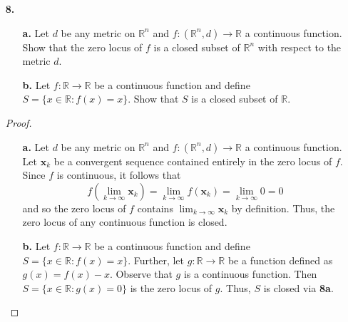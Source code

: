 \documentclass[ 12pt ]{article}
\begin{document}
\begin{enumerate}
		\begin{proof}
			Suppose by contradiction that there exists a closed set analog for the local continuity condition in terms of open sets. Let $\textbf{f} : \mathbb{R}^n \to \mathbb{R}^m$ be
			a constant function, $\textbf{f}(\textbf{x}) = \textbf{a} \in \mathbb{R}^m$ for all $\textbf{x} \in \mathbb{R}^n$. Clearly we can see that $\textbf{f}$ is a continuous
			function (see \textbf{2b}, same argument for $\mathbb{R}^2$ can be applied here). Let $B = \{ \textbf{a} \}$. Observe that $B$ is a closed set since $\lim_{k \to \infty}
			\textbf{a} = \textbf{a} \in B$. Additionally, the only proper subset of $B$ is $\varnothing$. Then by assumption, there exists a closed set $A \subseteq \mathbb{R}^n$ such
			that $\textbf{f}(A) = \varnothing$ but this would imply that $A = \varnothing$, contradicting the fact that $\textbf{x} \in A$.
		\end{proof}


	\item[\textbf{8.}]
		\begin{enumerate}
			\item[\textbf{a.}] Let $d$ be any metric on $\mathbb{R}^n$ and $f : (\mathbb{R}^n, d) \to \mathbb{R}$ a continuous function. Show that the zero locus of $f$ is a closed
				subset of $\mathbb{R}^n$ with respect to the metric $d$.
			\item[\textbf{b.}] Let $f : \mathbb{R} \to \mathbb{R}$ be a continuous function and define $S = \{ x \in \mathbb{R} : f(x) = x \}$. Show that $S$ is a closed subset of
				$\mathbb{R}$.
		\end{enumerate}

		\begin{proof} $ $
			\begin{enumerate}
				\item[\textbf{a.}] Let $d$ be any metric on $\mathbb{R}^n$ and $f : (\mathbb{R}^n, d) \to \mathbb{R}$ a continuous function. Let $\textbf{x}_k$ be a convergent sequence
					contained entirely in the zero locus of $f$. Since $f$ is continuous, it follows that $$f \left ( \lim_{k \to \infty} \textbf{x}_k \right ) = \lim_{k \to \infty}
					f(\textbf{x}_k) = \lim_{k \to \infty} 0 = 0$$ and so the zero locus of $f$ contains $\lim_{k \to \infty} \textbf{x}_k$ by definition. Thus, the zero locus of any
					continuous function is closed.

				\item[\textbf{b.}] Let $f : \mathbb{R} \to \mathbb{R}$ be a continuous function and define $S = \{ x \in \mathbb{R} : f(x) = x \}$. Further, let $g : \mathbb{R} \to
					\mathbb{R}$ be a function defined as $g(x) = f(x) - x$. Observe that $g$ is a continuous function. Then $S = \{ x \in \mathbb{R} : g(x) = 0 \}$ is the zero locus
					of $g$. Thus, $S$ is closed via \textbf{8a}.
			\end{enumerate}
		\end{proof}

\end{enumerate}
\end{document}
